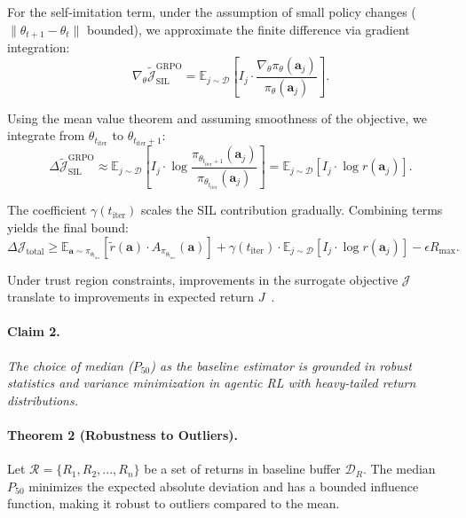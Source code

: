 \documentclass[]{youtu} %
\begin{document}
{For the self-imitation term, under the assumption of small policy changes ($\|\theta_{t+1} - \theta_t\|$ bounded), we approximate the finite difference via gradient integration:
\begin{equation}
    \nabla_\theta \tilde{\mathcal{J}}_{\text{SIL}}^{\text{GRPO}} = \mathbb{E}_{j \sim \mathcal{D}}\left[I_j \cdot \frac{\nabla_\theta \pi_{\theta}(\mathbf{a}_j)}{\pi_{\theta}(\mathbf{a}_j)}\right].
\end{equation}

Using the mean value theorem and assuming smoothness of the objective, we integrate from $\theta_{t_{\text{iter}}}$ to $\theta_{t_{\text{iter}}+1}$:
\begin{equation}
    \Delta \tilde{\mathcal{J}}_{\text{SIL}}^{\text{GRPO}} \approx \mathbb{E}_{j \sim \mathcal{D}}\left[I_j \cdot \log \frac{\pi_{\theta_{t_{\text{iter}}+1}}(\mathbf{a}_j)}{\pi_{\theta_{t_{\text{iter}}}}(\mathbf{a}_j)}\right] = \mathbb{E}_{j \sim \mathcal{D}}\left[I_j \cdot \log r(\mathbf{a}_j)\right].
\end{equation}

The coefficient $\gamma(t_{\text{iter}})$ scales the SIL contribution gradually. Combining terms yields the final bound:
\begin{equation}
    \Delta \mathcal{J}_{\text{total}} \geq \mathbb{E}_{\mathbf{a} \sim \pi_{\theta_{t_{\text{iter}}}}}\left[\tilde{r}(\mathbf{a}) \cdot A_{\pi_{\theta_{t_{\text{iter}}}}}(\mathbf{a})\right] + \gamma(t_{\text{iter}}) \cdot \mathbb{E}_{j \sim \mathcal{D}}\left[I_j \cdot \log r(\mathbf{a}_j)\right] - \epsilon R_{\max}.
\end{equation}

Under trust region constraints, improvements in the surrogate objective $\mathcal{J}$ translate to improvements in expected return $J$~\cite{schulman2017proximal}.


\paragraph{Claim 2.}\textit{The choice of median ($P_{50}$) as the baseline estimator is grounded in robust statistics and variance minimization in agentic RL with heavy-tailed return distributions.}

\paragraph{Theorem 2 (Robustness to Outliers).} Let $\mathcal{R} = \{R_1, R_2, ..., R_n\}$ be a set of returns in baseline buffer $\mathcal{D}_R$. The median $P_{50}$ minimizes the expected absolute deviation and has a bounded influence function, making it robust to outliers compared to the mean.

}
\end{document}

